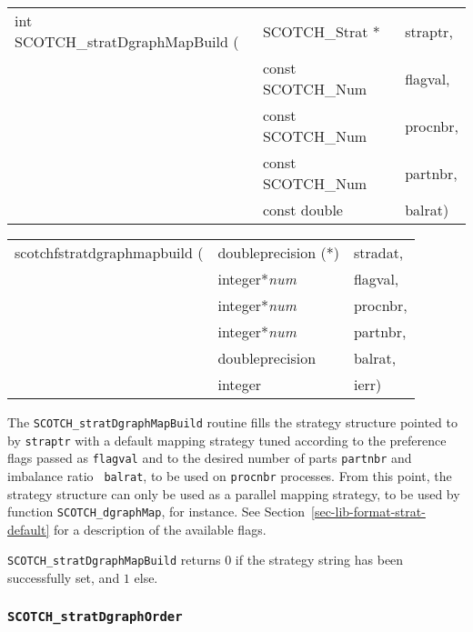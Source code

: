 \begin{itemize}
\progsyn

{\tt\begin{tabular}{l@{}ll}
int SCOTCH\_stratDgraphMapBuild ( & SCOTCH\_Strat *   & straptr, \\
                                  & const SCOTCH\_Num & flagval, \\
                                  & const SCOTCH\_Num & procnbr, \\
                                  & const SCOTCH\_Num & partnbr, \\
                                  & const double      & balrat)
\end{tabular}}

{\tt\begin{tabular}{l@{}ll}
scotchfstratdgraphmapbuild ( & doubleprecision (*) & stradat, \\
                             & integer*{\it num}   & flagval, \\
                             & integer*{\it num}   & procnbr, \\
                             & integer*{\it num}   & partnbr, \\
                             & doubleprecision     & balrat,  \\
                             & integer             & ierr)
\end{tabular}}

\progdes

The {\tt SCOTCH\_stratDgraphMapBuild} routine fills the strategy
structure pointed to by {\tt straptr} with a default mapping strategy
tuned according to the preference flags passed as {\tt flagval} and to
the desired number of parts {\tt partnbr} and imbalance ratio {\tt
balrat}, to be used on {\tt procnbr} processes. From this point, the
strategy structure can only be used as a parallel mapping strategy, to
be used by function {\tt SCOTCH\_\lbt dgraph\lbt Map}, for
instance. See Section~\ref{sec-lib-format-strat-default} for a
description of the available flags.

\progret

{\tt SCOTCH\_stratDgraphMapBuild} returns $0$ if the strategy string
has been successfully set, and $1$ else.
\end{itemize}

\subsubsection{{\tt SCOTCH\_stratDgraphOrder}}

